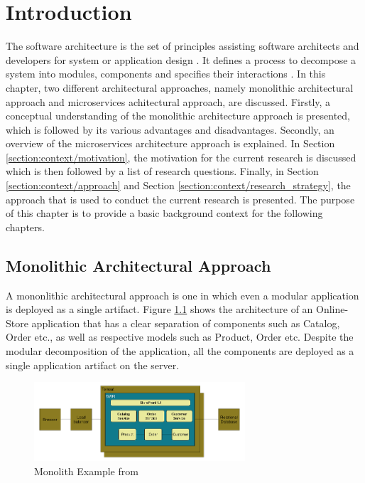\chapter{Introduction}\label{chapter:introduction}
The software architecture is the set of principles assisting software architects and developers for system or application design \cite{Dashofy:2009aa}. It defines a process to decompose a system into modules, components and specifies their interactions \cite{Brown:2015aa}. In this chapter, two different architectural approaches, namely monolithic architectural approach and microservices achitectural approach, are discussed. Firstly, a conceptual understanding of the monolithic architecture approach is presented, which is followed by its various advantages and disadvantages. Secondly, an overview of the microservices architecture approach is explained. In Section \ref{section:context/motivation}, the motivation for the current research is discussed which is then followed by a list of research questions. Finally, in Section \ref{section:context/approach} and Section \ref{section:context/research_strategy}, the approach that is used to conduct the current research is presented. The purpose of this chapter is to provide a basic background context for the following chapters.

\section{Monolithic Architectural Approach}\label{section:context/monolith}
A mononlithic architectural approach is one in which even a modular application is deployed as a single artifact. Figure \ref{fig:context/monolith-example} shows the architecture of an Online-Store application that has a clear separation of components such as Catalog, Order etc., as well as respective models such as Product, Order etc. Despite the modular decomposition of the application, all the components are deployed as a single application artifact on the server.\cite{Richardson:2014aa}\cite{Richardson:2014ab}

\begin{figure}[H]
\begin{center}
\includegraphics[width=0.7\textwidth]{figures/context-monolith-example}
\caption{Monolith Example from \cite{Richardson:2014aa}}
\label{fig:context/monolith-example}
\end{center}
\end{figure}


